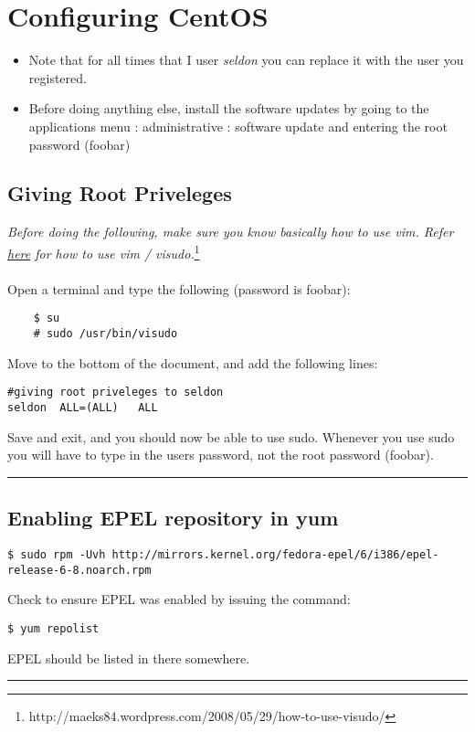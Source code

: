 \section{Configuring CentOS}
\begin{itemize}
\item{Note that for all times that I user \textit{seldon} you can replace it with the user you registered.}
\item{Before doing anything else, install the software updates by going to the applications menu : administrative : software update and entering the root password (foobar)}
\end{itemize}

\subsection{Giving Root Priveleges}
\textit{Before doing the following, make sure you know basically how to use vim. Refer \href{http://maeks84.wordpress.com/2008/05/29/how-to-use-visudo/}{here} for how to use vim / visudo.}\footnote{http://maeks84.wordpress.com/2008/05/29/how-to-use-visudo/}\\\\
Open a terminal and type the following (password is foobar):
\begin{snugshade}\begin{verbatim}
	$ su
	# sudo /usr/bin/visudo
\end{verbatim}\end{snugshade}\noindent
Move to the bottom of the document, and add the following lines:
\begin{snugshade}\begin{verbatim}
#giving root priveleges to seldon
seldon	ALL=(ALL)	ALL
\end{verbatim}\end{snugshade}\noindent
Save and exit, and you should now be able to use sudo. Whenever you use sudo you will have to type in the users password, not the root password (foobar).\\
\hrule

\subsection{Enabling EPEL repository in yum}
\begin{snugshade}\begin{verbatim}
$ sudo rpm -Uvh http://mirrors.kernel.org/fedora-epel/6/i386/epel-release-6-8.noarch.rpm
\end{verbatim}\end{snugshade}\noindent
Check to ensure EPEL was enabled by issuing the command:
\begin{snugshade}\begin{verbatim}
$ yum repolist
\end{verbatim}\end{snugshade}\noindent
EPEL should be listed in there somewhere.\\
\hrule

